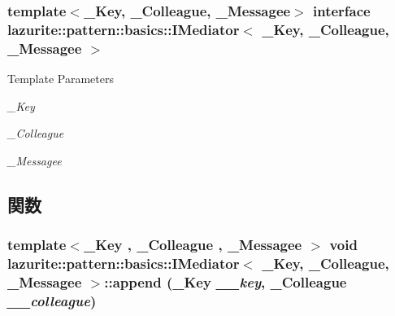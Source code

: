 \subsubsection*{template$<$\_\-Key, \_\-Colleague, \_\-Messagee$>$ interface lazurite::pattern::basics::IMediator$<$ \_\-Key, \_\-Colleague, \_\-Messagee $>$}


\begin{DoxyTemplParams}{Template Parameters}
\item[{\em \_\-Key}]\item[{\em \_\-Colleague}]\item[{\em \_\-Messagee}]\end{DoxyTemplParams}


\subsection{関数}
\hypertarget{interfacelazurite_1_1pattern_1_1basics_1_1_i_mediator_3_01___key_00_01___colleague_00_01___messagee_01_4_ae2b6ff4e0bf6be0986b40bd280d6a235}{
\subsubsection[{append}]{\setlength{\rightskip}{0pt plus 5cm}template$<$\_\-Key , \_\-Colleague , \_\-Messagee $>$ void lazurite::pattern::basics::IMediator$<$ \_\-Key, \_\-Colleague, \_\-Messagee $>$::append (\_\-Key {\em \_\-\_\-key}, \/  \_\-Colleague {\em \_\-\_\-colleague})}}
\label{interfacelazurite_1_1pattern_1_1basics_1_1_i_mediator_3_01___key_00_01___colleague_00_01___messagee_01_4_ae2b6ff4e0bf6be0986b40bd280d6a235}

